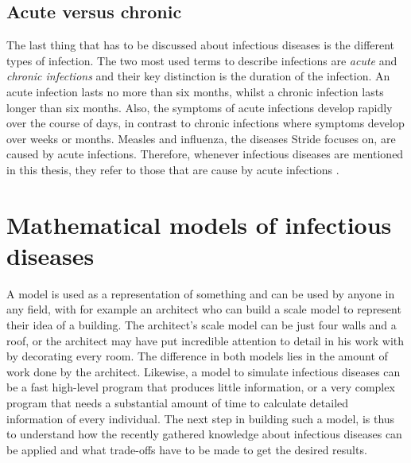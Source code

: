 \subsection{Acute versus chronic}
\label{subsec:acute_vs_chronic}
The last thing that has to be discussed about infectious diseases is the different types of infection. The two most used terms to describe infections are \textit{acute} and \textit{chronic infections} and their key distinction is the duration of the infection. An acute infection lasts no more than six months, whilst a chronic infection lasts longer than six months. Also, the symptoms of acute infections develop rapidly over the course of days, in contrast to chronic infections where symptoms develop over weeks or months. Measles and influenza, the diseases Stride focuses on, are caused by acute infections. Therefore, whenever infectious diseases are mentioned in this thesis, they refer to those that are cause by acute infections \cite{acute_infections}.

\section{Mathematical models of infectious diseases}
A model is used as a representation of something and can be used by anyone in any field, with for example an architect who can build a scale model to represent their idea of a building. The architect's scale model can be just four walls and a roof, or the architect may have put incredible attention to detail in his work with by decorating every room. The difference in both models lies in the amount of work done by the architect. Likewise, a model to simulate infectious diseases can be a fast high-level program that produces little information, or a very complex program that needs a substantial amount of time to calculate detailed information of every individual. The next step in building such a model, is thus to understand how the recently gathered knowledge about infectious diseases can be applied and what trade-offs have to be made to get the desired results.


